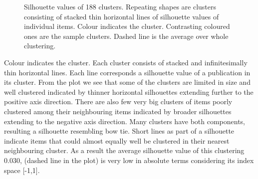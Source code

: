 \begin{figure}[htp]
\begin{center}
    \caption{Silhouette values of 188 clusters. Repeating shapes
    are clusters consisting of stacked thin horizontal lines of 
    silhouette values of individual items. Colour indicates the 
    cluster. Contrasting coloured ones are the sample clusters.
    Dashed line is the average over whole clustering.}
    \label{fig:silh01}
  \end{center}
\end{figure}
Colour indicates the cluster. Each cluster consists of stacked and 
infinitesimally thin horizontal lines. Each line corresponds a
silhouette value of a publication in its cluster. 
From the plot we see that some of the clusters are limited in size
and well clustered indicated by thinner horizontal silhouettes
extending further to the positive axis direction. There are also 
few very big clusters
of items poorly clustered among their neighbouring items indicated 
by broader silhouettes extending to the negative axis direction. Many clusters
have both components, resulting a silhouette resembling bow tie. 
Short lines as part of a silhouette indicate items that could 
almost equally well be clustered in their nearest neighbouring cluster.
As a result the average silhouette value of this clustering $0.030$,
(dashed line in the plot) is 
very low in absolute terms considering its index space [-1,1].

